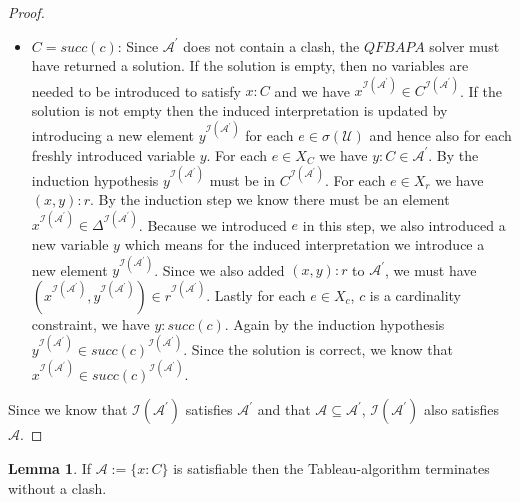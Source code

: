 \documentclass{book}
\theoremstyle{break}
\theoremstyle{definition}
\newtheorem{mylem}{Lemma}
\begin{document}
\begin{proof}
\begin{itemize}
\item $C=succ(c)$: Since $\mathcal{A}^\prime$ does not contain a clash, the $QFBAPA$ solver must have returned a solution. If the solution is empty, then no variables are needed to be introduced to satisfy $x:C$ and we have $x^{\mathcal{I}(\mathcal{A}^\prime)}\in C^{\mathcal{I}(\mathcal{A}^\prime)}$. If the solution is not empty then the induced interpretation is updated by introducing a new element $y^{\mathcal{I}(\mathcal{A}^\prime)}$ for each $e\in \sigma(\mathcal{U})$ and hence also for each freshly introduced variable $y$. For each $e\in X_C$ we have $y:C\in \mathcal{A}^\prime$. By the induction hypothesis $y^{\mathcal{I}(\mathcal{A}^\prime)}$ must be in $C^{\mathcal{I}(\mathcal{A}^\prime)}$. For each $e\in X_r$ we have $(x,y):r$. By the induction step we know there must be an element $x^{\mathcal{I}(\mathcal{A}^\prime)}\in\Delta^{\mathcal{I}(\mathcal{A}^\prime)}$. Because we introduced $e$ in this step, we also introduced a new variable $y$ which means for the induced interpretation we introduce a new element $y^{\mathcal{I}(\mathcal{A}^\prime)}$. Since we also added $(x,y):r$ to $\mathcal{A}^\prime$, we must have $(x^{\mathcal{I}(\mathcal{A}^\prime)},y^{\mathcal{I}(\mathcal{A}^\prime)})\in r^{\mathcal{I}(\mathcal{A}^\prime)}$. Lastly for each $e\in X_c$, $c$ is a cardinality constraint, we have $y:succ(c)$. Again by the induction hypothesis $y^{\mathcal{I}(\mathcal{A}^\prime)}\in succ(c)^{\mathcal{I}(\mathcal{A}^\prime)}$. Since the solution is correct, we know that $x^{\mathcal{I}(\mathcal{A}^\prime)}\in succ(c)^{\mathcal{I}(\mathcal{A}^\prime)}$.
\end{itemize}
Since we know that $\mathcal{I}(\mathcal{A}^\prime)$ satisfies $\mathcal{A}^\prime$ and that $\mathcal{A}\subseteq \mathcal{A}^\prime$, $\mathcal{I}(\mathcal{A}^\prime)$ also satisfies $\mathcal{A}$.
\end{proof}
\begin{mylem}
If $\mathcal{A}:=\{x:C\}$ is satisfiable then the Tableau-algorithm terminates without a clash.
\end{mylem}
\end{document}
